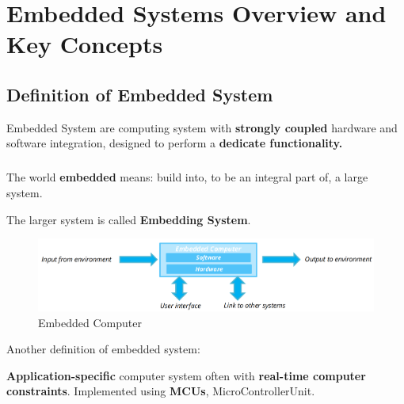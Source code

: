 \chapter{Embedded Systems Overview and Key Concepts}

\section{Definition of Embedded System}



\begin{tcolorbox}[colback=blue!5!white, colframe=blue!50!white, arc=0mm, sharp corners]

Embedded System are computing  system with \textbf{strongly coupled} hardware and software integration, designed to perform a \textbf{dedicate functionality.}
\end{tcolorbox}
\paragraph{}

The world \textbf{embedded} means: build into, to be an integral part of, a large system.


The larger system is called \textbf{Embedding System}.

\begin{figure}[H]
    \centering
    \includegraphics[width=0.8\linewidth]{img/img1.png}
    \caption{Embedded Computer}
\end{figure}

Another definition of embedded system: 

\begin{tcolorbox}[colback=blue!5!white, colframe=blue!50!white, arc=0mm, sharp corners]
\textbf{Application-specific} computer system often with \textbf{real-time computer constraints}.
Implemented using \textbf{MCUs}, MicroControllerUnit.
\end{tcolorbox}

